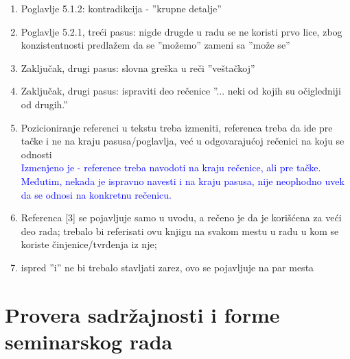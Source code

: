 \documentclass[a4paper]{report}
\newcommand{\odgovor}[1]{\textcolor{blue}{#1}}
\begin{document}
\begin{enumerate}
\item Poglavlje 5.1.2: kontradikcija - ''krupne detalje''

\item Poglavlje 5.2.1, treći pasus: nigde drugde u radu se ne koristi prvo lice, zbog konzistentnosti predlažem da se ''možemo'' zameni sa ''može se''

\item Zaključak, drugi pasus: slovna greška u reči ''veštačkoj''

\item Zaključak, drugi pasus: ispraviti deo rečenice ''... neki od kojih su očigledniji od drugih.''

\item Pozicioniranje referenci u tekstu treba izmeniti, referenca treba da ide pre tačke i ne na kraju pasusa/poglavlja, već u odgovarajućoj rečenici na koju se odnosti \\
\odgovor{Izmenjeno je - reference treba navodoti na kraju rečenice, ali pre tačke. Međutim, nekada je ispravno navesti i na kraju pasusa, nije neophodno uvek da se odnosi na konkretnu rečenicu.}

\item Referenca [3] se pojavljuje samo u uvodu, a rečeno je da je korišćena za veći deo rada; trebalo bi referisati ovu knjigu na svakom mestu u radu u kom se koriste činjenice/tvrđenja iz nje; 

\item ispred ''i'' ne bi trebalo stavljati zarez, ovo se pojavljuje na par mesta
\end{enumerate}


\section{Provera sadržajnosti i forme seminarskog rada}
\end{document}
